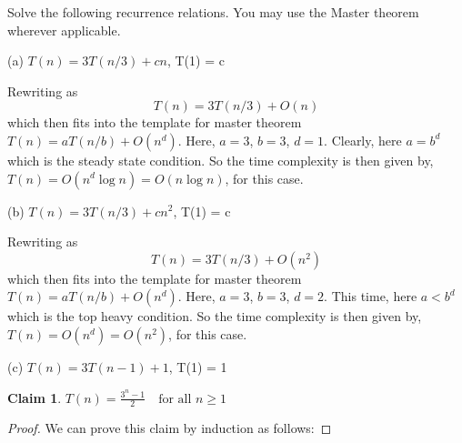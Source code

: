 \documentclass[answers]{exam}
\newtheorem{claim}{Claim}
\begin{document}
\begin{questions}
 
\question[5]

Solve the following recurrence relations. You may use the Master theorem wherever applicable.

(a) $T(n) = 3 T(n/3) + cn$,    T(1) = c
\begin{solution}
Rewriting as
\[
T(n) = 3 T(n/3) + O(n)
\]
which then fits into the template for master theorem $T(n) = a T(n/b) + O(n^d)$. Here, $a=3$, $b=3$, $d = 1$. Clearly, here $a = b^d$ which is the steady state condition. So the time complexity is then given by, $T(n) = O(n^d \log n) = O(n \log n)$, for this case.
\end{solution}

(b) $T(n) = 3 T(n/3) + cn^{2}$,  T(1) = c
\begin{solution}
Rewriting as
\[
T(n) = 3 T(n/3) + O(n^2)
\]
which then fits into the template for master theorem $T(n) = a T(n/b) + O(n^d)$. Here, $a=3$, $b=3$, $d = 2$. This time, here $a < b^d$ which is the top heavy condition. So the time complexity is then given by, $T(n) = O(n^d) = O(n^2)$, for this case.
\end{solution}

(c) $T(n) = 3 T(n-1) + 1$, T(1) = 1
\begin{solution}
\begin{claim}
$T(n) = \frac{3^n - 1}{2} \quad \text{for all } n \geq 1$
\end{claim}
\begin{proof}
We can prove this claim by induction as follows:

\end{proof}
\end{solution}
\end{questions}
\end{document}
